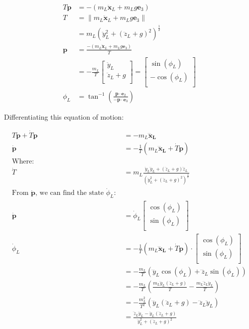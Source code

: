 \documentclass[11pt]{article}
\begin{document}
\begin{align*}
T \mathbf{p} &= - (m_L \mathbf{\ddot{x}}_L + m_L g \mathbf{e}_3) \\
T &= \| m_L \mathbf{\ddot{x}}_L + m_L g \mathbf{e}_3 \| \\
&= m_L ( \ddot{y}_L^2 + ( \ddot{z}_L + g)^2 ) ^{\frac{1}{2}} \\
\mathbf{p} &=  \frac{ - (m_L \mathbf{\ddot{x}}_L + m_L g \mathbf{e}_3) } { T } \\ 
&= - \frac{m_L}{T} 
\begin{bmatrix}
      \ddot{y}_L \\
      \ddot{z}_L + g \\
\end{bmatrix} 
= 
\begin{bmatrix}
       \sin(\phi_L) \\
       - \cos(\phi_L) \\
\end{bmatrix} \\
\phi_L &= \tan^{-1} \left( \frac{ \mathbf{p} \cdot \mathbf{e}_2 } { - \mathbf{p} \cdot \mathbf{e}_3 } \right)
\end{align*}

Differentiating this equation of motion: 

\begin{align*}
T \mathbf{\dot{p}} + \dot{T} \mathbf{p} &= -m_L \mathbf{\dddot{x}_L} \\
\mathbf{\dot{p}} &= - \frac{1}{T} (m_L \mathbf{\dddot{x}_L} + \dot{T} \mathbf{p} ) \\
\text{Where:} & \\
\dot{T} &= m_L \frac{ \ddot{y}_L \dddot{y}_L + (\ddot{z}_L + g) \dddot{z}_L } { ( \ddot{y}_L^2 + (\ddot{z}_L + g)^2 ) ^{\frac{1}{2}} } \\
\text{From $\mathbf{\dot{p}}$, we can find the state $\dot{\phi}_L$: } & \\
\mathbf{\dot{p}} &=  \dot{\phi}_L 
\begin{bmatrix}
       \cos(\phi_L) \\
       \sin(\phi_L) \\
\end{bmatrix} \\
\dot{\phi}_L &= - \frac{1}{T} (m_L \mathbf{\dddot{x}_L} + \dot{T} \mathbf{p} ) \cdot
\begin{bmatrix}
       \cos(\phi_L) \\
       \sin(\phi_L) \\
\end{bmatrix} \\ 
&= - \frac{m_L} {T} ( \dddot{y}_L \cos(\phi_L) + \dddot{z}_L \sin(\phi_L) ) \\
&= - \frac{m_L}{T} ( \frac{ m_L \dddot{y}_L (\ddot{z}_L + g) } {T} - \frac{ m_L \dddot{z}_L \ddot{y}_L }{T} ) \\
&= - \frac{ m_L^2 }{T^2} ( \dddot{y}_L (\ddot{z}_L + g) - \dddot{z}_L \ddot{y}_L ) \\
&= \frac{ \dddot{z}_L \ddot{y}_L - \ddot{y}_L (\ddot{z}_L + g) } { \dddot{y}_L^2 + (\ddot{z}_L+g)^2 }
\end{align*}
\end{document}
